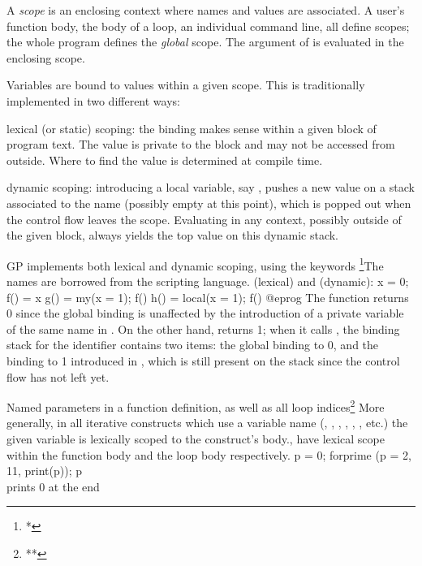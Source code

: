 
A \emph{scope} is an enclosing context where names and values are associated.
A user's function body, the body of a loop, an individual command line, all
define scopes; the whole program defines the \emph{global} scope. The
argument of  is evaluated in the enclosing scope.

Variables are bound to values within a given scope. This is traditionally
implemented in two different ways:

\item{} lexical (or static) scoping: the binding makes
sense within a given block of program text. The value is private to the block
and may not be accessed from outside. Where to find the value is determined
at compile time.

\item{} dynamic scoping: introducing a local variable,
say , pushes a new value on a stack associated to the name 
(possibly empty at this point), which is popped out when the control flow
leaves the scope. Evaluating  in any context, possibly outside of the
given block, always yields the top value on this dynamic stack.

GP implements both lexical and dynamic scoping, using the keywords%
\footnote{*}{The names are borrowed from the  scripting language.}
 (lexical) and  (dynamic):
\bprog
  x = 0;
  f() = x
  g() =    my(x = 1); f()
  h() = local(x = 1); f()
@eprog\noindent
The function  returns 0 since the global  binding
is unaffected by the introduction of a private variable of the same name in
. On the other hand,  returns 1; when it calls , the
binding stack for the  identifier contains two items: the global
binding to 0, and the binding to 1 introduced in , which is still
present on the stack since the control flow has not left  yet.


Named parameters in a function definition, as well as all loop
indices\footnote{**}{
More generally, in all iterative constructs which use a variable name
(, , , , ,
, etc.) the given variable is lexically scoped to the construct's
body.},
have lexical scope within the function body and the loop body respectively.
\bprog
p = 0;
forprime (p = 2, 11, print(p)); p   \\ prints 0 at the end

